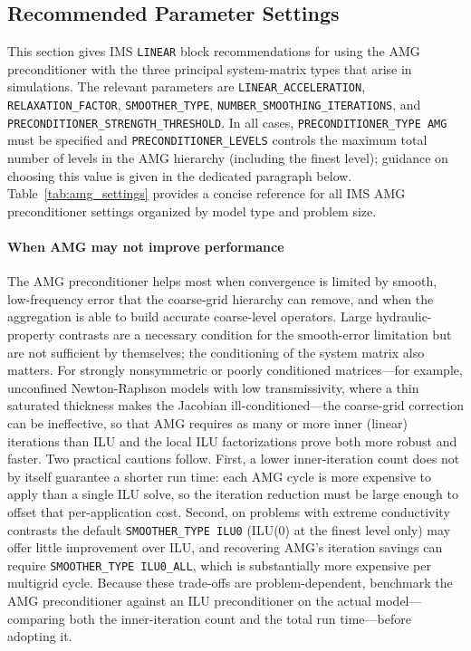 \subsection{Recommended Parameter Settings}
\label{sec:recommended}

This section gives \mf IMS \texttt{LINEAR} block recommendations for using the AMG preconditioner with the three principal system-matrix types that arise in \mf simulations. The relevant parameters are \texttt{LINEAR\_ACCELERATION}, \texttt{RELAXATION\_FACTOR}, \texttt{SMOOTHER\_TYPE}, \texttt{NUMBER\_SMOOTHING\_ITERATIONS}, and \texttt{PRECONDITIONER\_STRENGTH\_THRESHOLD}. In all cases, \texttt{PRECONDITIONER\_TYPE AMG} must be specified and \texttt{PRECONDITIONER\_LEVELS} controls the maximum total number of levels in the AMG hierarchy (including the finest level); guidance on choosing this value is given in the dedicated paragraph below. Table~\ref{tab:amg_settings} provides a concise reference for all IMS AMG preconditioner settings organized by model type and problem size.

\paragraph{When AMG may not improve performance}
The AMG preconditioner helps most when convergence is limited by smooth, low-frequency error that the coarse-grid hierarchy can remove, and when the aggregation is able to build accurate coarse-level operators. Large hydraulic-property contrasts are a necessary condition for the smooth-error limitation but are not sufficient by themselves; the conditioning of the system matrix also matters. For strongly nonsymmetric or poorly conditioned matrices---for example, unconfined Newton-Raphson models with low transmissivity, where a thin saturated thickness makes the Jacobian ill-conditioned---the coarse-grid correction can be ineffective, so that AMG requires as many or more inner (linear) iterations than ILU and the local ILU factorizations prove both more robust and faster. Two practical cautions follow. First, a lower inner-iteration count does not by itself guarantee a shorter run time: each AMG cycle is more expensive to apply than a single ILU solve, so the iteration reduction must be large enough to offset that per-application cost. Second, on problems with extreme conductivity contrasts the default \texttt{SMOOTHER\_TYPE ILU0} (ILU(0) at the finest level only) may offer little improvement over ILU, and recovering AMG's iteration savings can require \texttt{SMOOTHER\_TYPE ILU0\_ALL}, which is substantially more expensive per multigrid cycle. Because these trade-offs are problem-dependent, benchmark the AMG preconditioner against an ILU preconditioner on the actual model---comparing both the inner-iteration count and the total run time---before adopting it.

